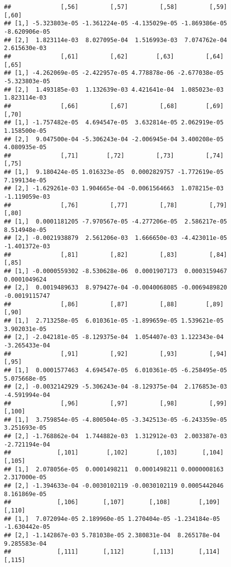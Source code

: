 \documentclass[
]{article}
\begin{document}
\begin{verbatim}
##              [,56]         [,57]         [,58]         [,59]         [,60]
## [1,] -5.323803e-05 -1.361224e-05 -4.135029e-05 -1.869386e-05 -8.620906e-05
## [2,]  1.823114e-03  8.027095e-04  1.516993e-03  7.074762e-04  2.615630e-03
##              [,61]         [,62]        [,63]         [,64]         [,65]
## [1,] -4.262069e-05 -2.422957e-05 4.778878e-06 -2.677038e-05 -5.323803e-05
## [2,]  1.493185e-03  1.132639e-03 4.421641e-04  1.085023e-03  1.823114e-03
##              [,66]         [,67]         [,68]        [,69]        [,70]
## [1,] -1.757482e-05  4.694547e-05  3.632814e-05 2.062919e-05 1.158500e-05
## [2,]  9.047500e-04 -5.306243e-04 -2.006945e-04 3.400208e-05 4.080935e-05
##              [,71]        [,72]         [,73]         [,74]         [,75]
## [1,]  9.180424e-05 1.016323e-05  0.0002829757 -1.772619e-05  7.199134e-05
## [2,] -1.629261e-03 1.904665e-04 -0.0061564663  1.078215e-03 -1.119059e-03
##              [,76]         [,77]         [,78]         [,79]         [,80]
## [1,]  0.0001181205 -7.970567e-05 -4.277206e-05  2.586217e-05  8.514948e-05
## [2,] -0.0021938879  2.561206e-03  1.666650e-03 -4.423011e-05 -1.401372e-03
##              [,81]         [,82]         [,83]         [,84]         [,85]
## [1,] -0.0000559302 -8.530628e-06  0.0001907173  0.0003159467  0.0001049624
## [2,]  0.0019489633  8.979427e-04 -0.0040068085 -0.0069489820 -0.0019115747
##              [,86]         [,87]         [,88]        [,89]         [,90]
## [1,]  2.713258e-05  6.010361e-05 -1.899659e-05 1.539621e-05  3.902031e-05
## [2,] -2.042181e-05 -8.129375e-04  1.054407e-03 1.122343e-04 -3.265433e-04
##              [,91]         [,92]         [,93]         [,94]         [,95]
## [1,]  0.0001577463  4.694547e-05  6.010361e-05 -6.258495e-05  5.075668e-05
## [2,] -0.0032142929 -5.306243e-04 -8.129375e-04  2.176853e-03 -4.591994e-04
##              [,96]         [,97]         [,98]         [,99]        [,100]
## [1,]  3.759854e-05 -4.800504e-05 -3.342513e-05 -6.243359e-05  3.251693e-05
## [2,] -1.768862e-04  1.744882e-03  1.312912e-03  2.003387e-03 -2.721194e-04
##             [,101]        [,102]        [,103]       [,104]       [,105]
## [1,]  2.078056e-05  0.0001498211  0.0001498211 0.0000008163 2.317000e-05
## [2,] -1.394633e-04 -0.0030102119 -0.0030102119 0.0005442046 8.161869e-05
##             [,106]       [,107]       [,108]        [,109]        [,110]
## [1,]  7.072094e-05 2.189960e-05 1.270404e-05 -1.234184e-05 -1.630442e-05
## [2,] -1.142867e-03 5.781038e-05 2.380831e-04  8.265178e-04  9.285583e-04
##             [,111]       [,112]        [,113]       [,114]        [,115]

\end{verbatim}
\end{document}
